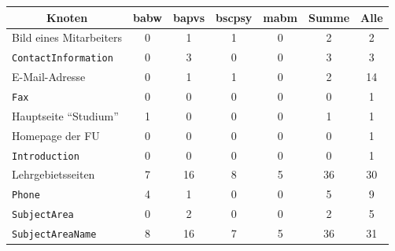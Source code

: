         \begin{table}[!h]
            \centering
            \begin{tabular}{|l|c|c|c|c|c|c|}
                \hline
                \multicolumn{1}{|c|}{\textbf{Knoten}} & \textbf{\gls{babw}} & \textbf{\gls{bapvs}} & \textbf{\gls{bscpsy}} & \textbf{\gls{mabm}} & \textbf{Summe} & \textbf{Alle} \\ \hline
                Bild eines Mitarbeiters                                  & 0             & 1              & 1               & 0             & 2              & 2             \\ \hline
                \texttt{ContactInformation}                    & 0             & 3              & 0               & 0             & 3              & 3             \\ \hline
                E-Mail-Adresse                        & 0             & 1              & 1               & 0             & 2              & 14            \\ \hline
                \texttt{Fax}                                   & 0             & 0              & 0               & 0             & 0              & 1             \\ \hline
                Hauptseite "`Studium"'                & 1             & 0              & 0               & 0             & 1              & 1             \\ \hline
                Homepage der FU                       & 0             & 0              & 0               & 0             & 0              & 1             \\ \hline
                \texttt{Introduction}                          & 0             & 0              & 0               & 0             & 0              & 1             \\ \hline
                Lehrgebietsseiten                     & 7             & 16             & 8               & 5             & 36             & 30            \\ \hline
                \texttt{Phone}                                 & 4             & 1              & 0               & 0             & 5              & 9             \\ \hline
                \texttt{SubjectArea}                           & 0             & 2              & 0               & 0             & 2              & 5             \\ \hline
                \texttt{SubjectAreaName}                       & 8             & 16             & 7               & 5             & 36             & 31            \\ \hline

\end{tabular}
\end{table}
